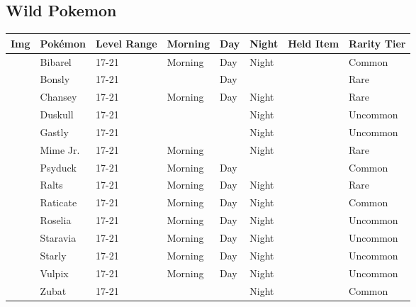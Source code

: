 \subsection{Wild Pokemon}%
\label{subsec:WildPokemon}%
\begin{longtable}{||l l l l l l l l||}%
\hline%
Img&Pokémon&Level Range&Morning&Day&Night&Held Item&Rarity Tier\\%
\hline%
\endhead%
\hline%
&Bibarel&17{-}21&Morning&Day&Night&&Common\\%
\hline%
&Bonsly&17{-}21&&Day&&&Rare\\%
\hline%
&Chansey&17{-}21&Morning&Day&Night&&Rare\\%
\hline%
&Duskull&17{-}21&&&Night&&Uncommon\\%
\hline%
&Gastly&17{-}21&&&Night&&Uncommon\\%
\hline%
&Mime Jr.&17{-}21&Morning&&Night&&Rare\\%
\hline%
&Psyduck&17{-}21&Morning&Day&&&Common\\%
\hline%
&Ralts&17{-}21&Morning&Day&Night&&Rare\\%
\hline%
&Raticate&17{-}21&Morning&Day&Night&&Common\\%
\hline%
&Roselia&17{-}21&Morning&Day&Night&&Uncommon\\%
\hline%
&Staravia&17{-}21&Morning&Day&Night&&Uncommon\\%
\hline%
&Starly&17{-}21&Morning&Day&Night&&Uncommon\\%
\hline%
&Vulpix&17{-}21&Morning&Day&Night&&Uncommon\\%
\hline%
&Zubat&17{-}21&&&Night&&Common\\%
\hline%
\end{longtable}